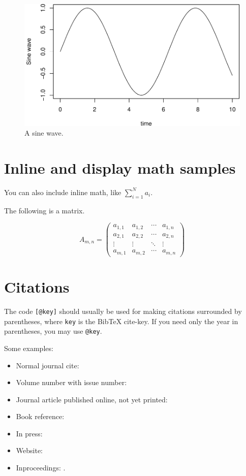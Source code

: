 \documentclass[preprint]{JASA}
\begin{document}
\begin{figure}
\includegraphics[width=\reprintcolumnwidth]{JASA_Wenz_article_files/figure-latex/Figure2} \caption{A sine wave.}\label{fig:Figure2}
\end{figure}

\hypertarget{inline-and-display-math-samples}{%
\section{Inline and display math
samples}\label{inline-and-display-math-samples}}

You can also include inline math, like \(\sum\nolimits_{i=1}^N a_i\).

The following is a matrix.

\[
A_{m,n} = 
 \begin{pmatrix}
  a_{1,1} & a_{1,2} & \cdots & a_{1,n} \\
  a_{2,1} & a_{2,2} & \cdots & a_{2,n} \\
  \vdots  & \vdots  & \ddots & \vdots  \\
  a_{m,1} & a_{m,2} & \cdots & a_{m,n} 
 \end{pmatrix}
\]

\hypertarget{citations}{%
\section{Citations}\label{citations}}

The code \texttt{{[}@key{]}} should usually be used for making citations
surrounded by parentheses, where \texttt{key} is the BibTeX cite-key. If
you need only the year in parentheses, you may use \texttt{@key}.

Some examples:

\begin{itemize}
\item
  Normal journal cite: \citep{joursamp1}
\item
  Volume number with issue number: \citep{joursamp3}
\item
  Journal article published online, not yet printed: \citep[published
  online,][]{sampMisc2}
\item
  Book reference: \citep{booksamp1}
\item
  In press: \citep[in press,][]{inpress2}
\item
  Website: \citep{websiteauthyear}
\item
  Inproceedings: \citep{sampinproceedings3}.
\end{itemize}
\end{document}
